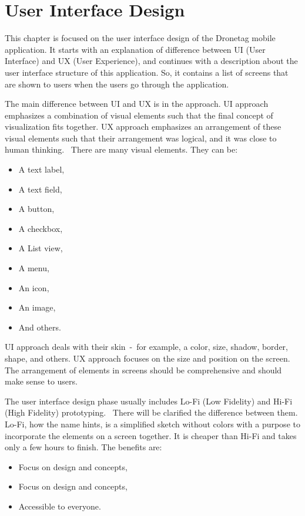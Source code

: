 \chapter{User Interface Design}\label{ch:user-interface-design}
This chapter is focused on the user interface design of the Dronetag mobile application.
It starts with an explanation of difference between UI (User Interface) and UX (User Experience), and continues with a description about the user interface structure of this application.
So, it contains a list of screens that are shown to users when the users go through the application.

The main difference between UI and UX is in the approach.
UI approach emphasizes a combination of visual elements such that the final concept of visualization fits together.
UX approach emphasizes an arrangement of these visual elements such that their arrangement was logical, and it was close to human thinking.~\cite{prototyping}
There are many visual elements.
They can be:
\begin{itemize}
    \item A text label,
    \item A text field,
    \item A button,
    \item A checkbox,
    \item A List view,
    \item A menu,
    \item An icon,
    \item An image,
    \item And others.
\end{itemize}
UI approach deals with their skin~-~for example, a color, size, shadow, border, shape, and others.
UX approach focuses on the size and position on the screen.
The arrangement of elements in screens should be comprehensive and should make sense to users.

The user interface design phase usually includes Lo-Fi (Low Fidelity) and Hi-Fi (High Fidelity) prototyping.~\cite{effectivePrototyping}
There will be clarified the difference between them.
Lo-Fi, how the name hints, is a simplified sketch without colors with a purpose to incorporate the elements on a screen together.
It is cheaper than Hi-Fi and takes only a few hours to finish.
The benefits are:
\begin{itemize}
    \item Focus on design and concepts,
    \item Focus on design and concepts,
    \item Accessible to everyone.~\cite{hiFiLoFiPrototypeArticle}
\end{itemize}

